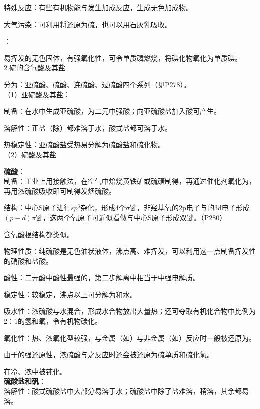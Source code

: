 \documentclass[a4paper,UTF8]{article}
\begin{document}
特殊反应：有些有机物能与发生加成反应，生成无色加成物。

大气污染：可利用将还原为硫，也可以用石灰乳吸收。

：

易挥发的无色固体，有强氧化性，可令单质磷燃烧，将碘化物氧化为单质碘。\\

2.硫的含氧酸及其盐

分为：亚硫酸、硫酸、连硫酸、过硫酸四个系列（见P278）。\\

（1）亚硫酸及其盐：

制备：在水中生成亚硫酸，为二元中强酸；向亚硫酸盐加入酸可产生。

溶解性：正盐（除）都难溶于水，酸式盐都可溶于水。

热稳定性：亚硫酸盐受热易分解为硫酸盐和硫化物。\\

（2）硫酸及其盐

\textbf{硫酸}：\\

制备：工业上用接触法，在空气中焙烧黄铁矿或硫磺制得，再通过催化剂氧化为，再用浓硫酸吸收即可制得发烟硫酸。

结构：中心S原子进行$sp^3$杂化，形成4个$\sigma$键，非羟基氧的2p电子与的3d电子形成$(p-d)\pi 键$，这两个氧原子可近似看做与中心S原子形成双键。（P280）

含氧酸根结构都类似。

物理性质：纯硫酸是无色油状液体，沸点高、难挥发，可以利用这一点制备挥发性的硝酸和盐酸。

酸性：二元酸中酸性最强的，第二步解离中相当于中强电解质。

稳定性：较稳定，沸点以上可分解为和水。

吸水性：浓硫酸与水混合，形成水合物放出大量热；还可夺取有机化合物中比例为2：1的氢和氧，令有机物碳化。

氧化性：热、浓氧化型较强，与金属（如）与非金属（如）反应时一般被还原为。

由于的强还原性，浓硫酸与之反应时还会被还原为硫单质和硫化氢。

在冷、浓中被钝化。\\

\textbf{硫酸盐和矾}：\\

溶解性：酸式硫酸盐中大部分易溶于水；硫酸盐中除了盐难溶，稍溶，其余都易溶。
\end{document}
